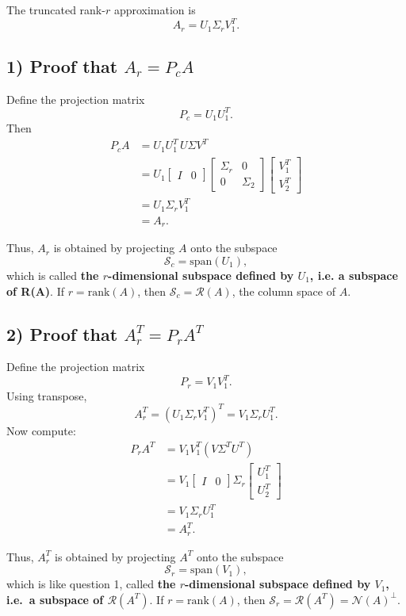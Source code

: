 \documentclass[12pt]{article}
\begin{document}
The truncated rank-$r$ approximation is
\[
A_r = U_1 \Sigma_r V_1^T.
\]

\subsection*{1) Proof that $A_r = P_c A$}
Define the projection matrix
\[
P_c = U_1 U_1^T.
\]
Then
\[
\begin{aligned}
P_c A
&= U_1 U_1^T \, U \Sigma V^T \\
&= U_1
\begin{bmatrix} I & 0 \end{bmatrix}
\begin{bmatrix}
\Sigma_r & 0 \\
0 & \Sigma_2
\end{bmatrix}
\begin{bmatrix} V_1^T \\ V_2^T \end{bmatrix} \\
&= U_1 \Sigma_r V_1^T \\
&= A_r.
\end{aligned}
\]

\noindent
Thus, $A_r$ is obtained by projecting $A$ onto the subspace
\[
\mathcal{S}_c = \mathrm{span}(U_1),
\]
which is called \textbf{the $r$-dimensional subspace defined by $U_1$, i.e. a subspace of R(A)}.
If $r = \mathrm{rank}(A)$, then $\mathcal{S}_c = \mathcal{R}(A)$, the column space of $A$.

\subsection*{2) Proof that $A_r^T = P_r A^T$}
Define the projection matrix
\[
P_r = V_1 V_1^T.
\]
Using transpose,
\[
A_r^T = (U_1 \Sigma_r V_1^T)^T = V_1 \Sigma_r U_1^T.
\]
Now compute:
\[
\begin{aligned}
P_r A^T
&= V_1 V_1^T (V \Sigma^T U^T) \\
&= V_1
\begin{bmatrix} I & 0 \end{bmatrix}
\Sigma_r
\begin{bmatrix} U_1^T \\ U_2^T \end{bmatrix} \\
&= V_1 \Sigma_r U_1^T \\
&= A_r^T.
\end{aligned}
\]

\noindent
Thus, $A_r^T$ is obtained by projecting $A^T$ onto the subspace
\[
\mathcal{S}_r = \mathrm{span}(V_1),
\]
which is like question 1, called \textbf{the $r$-dimensional subspace defined by $V_1$, i.e.\ a subspace of $\mathcal{R}(A^T)$}.
If $r = \mathrm{rank}(A)$, then $\mathcal{S}_r = \mathcal{R}(A^T) = \mathcal{N}(A)^\perp$.
\end{document}
